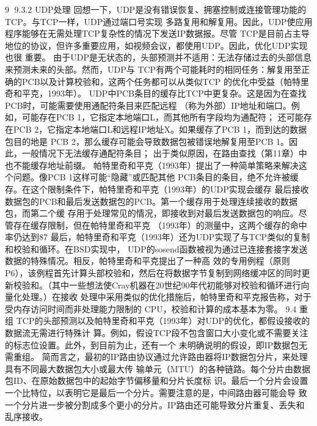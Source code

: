                                                     9
9.3.2 UDP处理
回想一下，UDP是没有错误恢复、拥塞控制或连接管理功能的TCP。与TCP一样，UDP通过端口号实现
多路复用和解复用。因此，UDP使应用程序能够在无需处理TCP复杂性的情况下发送IP数据报。尽管
TCP是目前占主导地位的协议，但许多重要应用，如视频会议，都使用UDP。因此，优化UDP实现也很
重要。
由于UDP是无状态的，头部预测并不适用：无法存储过去的头部信息来预测未来的头部。然而，UDP与
TCP有两个可能耗时的相同任务：解复用至正确的PCB以及计算校验和，这两个任务都可以从类似TCP
的优化中受益（帕特里奇和平克，1993年）。
UDP中PCB条目的缓存比TCP中更复杂。这是因为在查找PCB时，可能需要使用通配符条目来匹配远程
（称为外部）IP地址和端口。例如，可能存在PCB 1，它指定本地端口L，而其他所有字段均为通配符；
还可能存在PCB 2，它指定本地端口L和远程IP地址X。如果缓存了PCB 1，而到达的数据包目的地是
PCB 2，那么缓存可能会导致数据包被错误地解复用至PCB 1。因此，一般情况下无法缓存通配符条目；
出于类似原因，在路由查找（第11章）中也不能缓存地址前缀。
帕特里奇和平克（1993年）提出了一种简单策略来解决这个问题。像PCB 1这样可能“隐藏”或匹配其他
PCB条目的条目，绝不允许被缓存。在这个限制条件下，帕特里奇和平克（1993年）的UDP实现会缓存
最后接收数据包的PCB和最后发送数据包的PCB。第一个缓存用于处理连续接收的数据包，而第二个缓
存用于处理常见的情况，即接收到对最后发送数据包的响应。尽管存在缓存限制，但在帕特里奇和平克
（1993年）的测量中，这两个缓存的命中率仍达到87%
最后，帕特里奇和平克（1993年）还为UDP实现了与TCP类似的复制和校验和循环。在BSD实现中，
UDP的sosend函数被视为通过已连接套接字发送数据的特殊情况。相反，帕特里奇和平克提出了一种高
效的专用例程（原则P6），该例程首先计算头部校验和，然后在将数据字节复制到网络缓冲区的同时更
新校验和。（其中一些想法使Cray机器在20世纪90年代初能够对校验和循环进行向量化处理。）在接收
处理中采用类似的优化措施后，帕特里奇和平克报告称，对于受内存访问时间而非处理能力限制的
CPU，校验和计算的成本基本为零。
9.4 重组
TCP的头部预测以及帕特里奇和平克（1993年）对UDP的优化，都假设接收的数据流无需进行特殊计
算。例如，假设TCP段不包含窗口大小变化或不需要关注的标志位设置。此外，到目前为止，还有一个
未明确说明的假设，即IP数据包无需重组。
简而言之，最初的IP路由协议通过允许路由器将IP数据包分片，来处理具有不同最大数据包大小或最大传
输单元（MTU）的各种链路。每个分片由数据包ID、在原始数据包中的起始字节偏移量和分片长度标
识。最后一个分片会设置一个比特位，以表明它是最后一个分片。需要注意的是，中间路由器可能会导
致一个分片进一步被分割成多个更小的分片。IP路由还可能导致分片重复、丢失和乱序接收。

